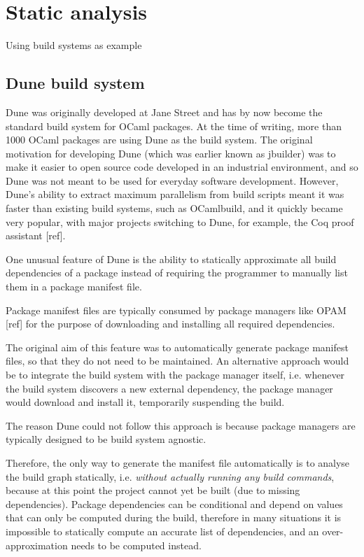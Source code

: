 \section{Static analysis}\label{sec-static}

Using build systems as example

\subsection{Dune build system}

Dune was originally developed at Jane Street and has by now become the standard
build system for OCaml packages. At the time of writing, more than 1000 OCaml
packages are using Dune as the build system. The original motivation for
developing Dune (which was earlier known as \textsf{jbuilder}) was to make it
easier to open source code developed in an industrial environment, and so Dune
was not meant to be used for everyday software development. However, Dune's
ability to extract maximum parallelism from build scripts meant it was faster
than existing build systems, such as OCamlbuild, and it quickly became very
popular, with major projects switching to Dune, for example, the Coq proof
assistant [ref].


One unusual feature of Dune is the ability to statically approximate all build
dependencies of a package instead of requiring the programmer to manually list
them in a package manifest file.

Package manifest files are typically consumed by package managers like
OPAM [ref] for the purpose of downloading and installing all required
dependencies.


The original aim of this feature was to automatically generate package manifest
files, so that they do not need to be maintained. An alternative approach would
be to integrate the build system with the package manager itself, i.e. whenever
the build system discovers a new external dependency, the package manager would
download and install it, temporarily suspending the build.

The reason Dune could not follow this approach is because package managers are
typically designed to be build system agnostic.

Therefore, the only way to generate the manifest file automatically is to
analyse the build graph statically, i.e. \emph{without actually running any
build commands}, because at this point the project cannot yet be built (due
to missing dependencies). Package dependencies can be conditional and depend
on values that can only be computed during the build, therefore in many
situations it is impossible to statically compute an accurate list of
dependencies, and an over-approximation needs to be computed instead.

